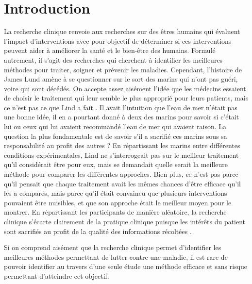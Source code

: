 \documentclass[
  12pt,
]{book}
\begin{document}
\section{Introduction}\label{introduction}

La recherche clinique renvoie aux recherches sur des êtres humains qui évaluent l'impact d'interventions avec pour objectif de déterminer si ces interventions peuvent aider à améliorer la santé et le bien-être des humains. Formulé autrement, il s'agit des recherches qui cherchent à identifier les meilleures méthodes pour traiter, soigner et prévenir les maladies. Cependant, l'histoire de James Lund amène à se questionner sur le sort des marins qui n'ont pas guéri, voire qui sont décédés. On accepte assez aisément l'idée que les médecins essaient de choisir le traitement qui leur semble le plus approprié pour leurs patients, mais ce n'est pas ce que Lind a fait \citep{sep-clinical-research}. Il avait l'intuition que l'eau de mer n'était pas une bonne idée, il en a pourtant donné à deux des marins pour savoir si c'était lui ou ceux qui lui avaient recommandé l'eau de mer qui avaient raison. La question la plus fondamentale est de savoir s'il a sacrifié ces marins sous sa responsabilité au profit des autres ?
En répartissant les marins entre différentes conditions expérimentales, Lind ne s'interrogeait pas sur le meilleur traitement qu'il considérait être pour eux, mais se demandait quelle serait la meilleure méthode pour comparer les différentes approches. Bien plus, ce n'est pas parce qu'il pensait que chaque traitement avait les mêmes chances d'être efficace qu'il les a comparés, mais parce qu'il était convaincu que plusieurs interventions pouvaient être nuisibles, et que son approche était le meilleur moyen pour le montrer. En répartissant les participants de manière aléatoire, la recherche clinique s'écarte clairement de la pratique clinique puisque les intérêts du patient sont sacrifiés au profit de la qualité des informations récoltées \citep{sep-clinical-research}.

Si on comprend aisément que la recherche clinique permet d'identifier les meilleures méthodes permettant de lutter contre une maladie, il est rare de pouvoir identifier au travers d'une seule étude une méthode efficace et sans risque permettant d'atteindre cet objectif.
\end{document}
